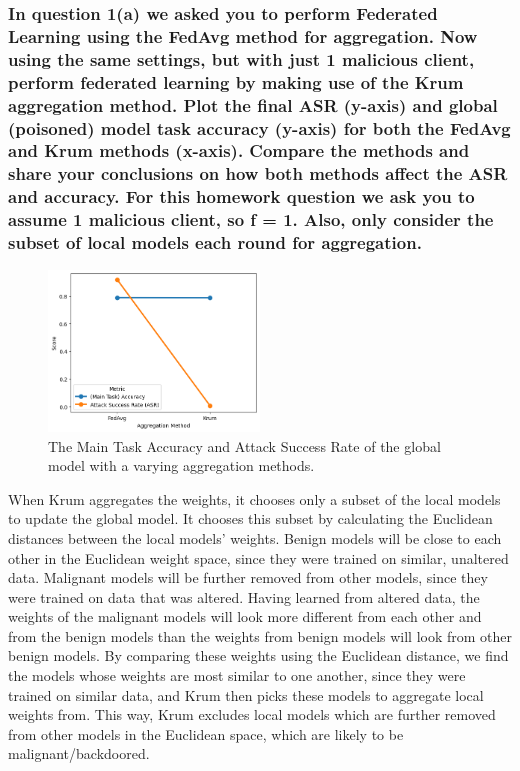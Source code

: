 \documentclass{article}
\begin{document}
\subsubsection{In question 1(a) we asked you to perform Federated Learning using
the FedAvg method for aggregation. Now using the same settings, but with just
1 malicious client, perform federated learning by making use of the Krum aggregation method. Plot the final ASR (y-axis) and global (poisoned) model task
accuracy (y-axis) for both the FedAvg and Krum methods (x-axis). Compare
the methods and share your conclusions on how both methods affect the ASR
and accuracy. For this homework question we ask you to assume 1 malicious
client, so f = 1. Also, only consider the subset of local models each round for
aggregation.}
\begin{figure}
    \centering
    \includegraphics[width=0.5\textwidth]{aggregation_method.png}
    \caption{The Main Task Accuracy and Attack Success Rate of the global model with a varying aggregation methods.}
    \label{fig:aggregation_method}
\end{figure}

When Krum aggregates the weights, it chooses only a subset of the local models to update the global model.
It chooses this subset by calculating the Euclidean distances between the local models' weights.
Benign models will be close to each other in the Euclidean weight space, since they were trained on similar, unaltered data.
Malignant models will be further removed from other models, since they were trained on data that was altered.
Having learned from altered data, the weights of the malignant models will look more different from each other and from the benign models than the weights from benign models will look from other benign models.
By comparing these weights using the Euclidean distance, we find the models whose weights are most similar to one another, since they were trained on similar data, and Krum then picks these models to aggregate local weights from.
This way, Krum excludes local models which are further removed from other models in the Euclidean space, which are likely to be malignant/backdoored.
\end{document}
